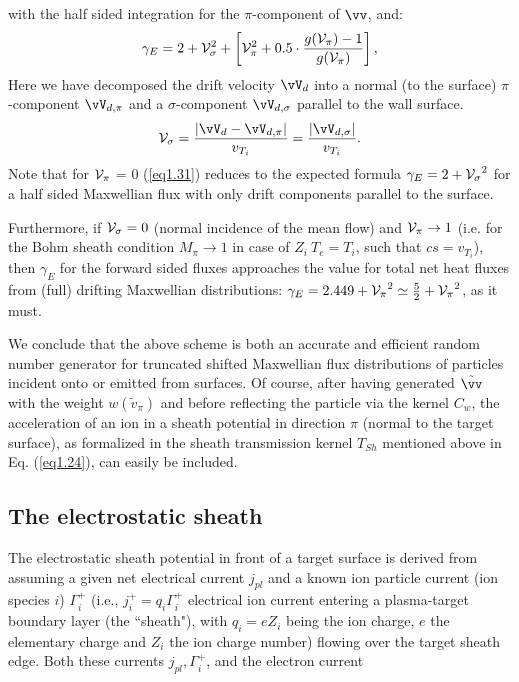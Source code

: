 with the half sided integration for the $\pi$-component of
$\vv$, and:
 \begin{equation}
\gamma_E   =    2 + {\cal V}_\sigma^2    + \left[{\cal V}_\pi^2    +   0.5
\cdot \frac{g({\cal V}_{\pi} )  - 1}{g({\cal V}_{\pi} )}\right]       , \label{eq1.31}
\end{equation}
Here we have decomposed the drift velocity $\vV_d$ into a
normal (to the surface) $\pi$-component $\vV_{d,\pi}$ and a $\sigma$-component $\vV_{d,\sigma}$ parallel to
the wall surface.
\begin{equation}
{\cal V}_{\sigma}   = \frac{ | \vV_d   -   \vV_{d,
\pi} | } {  v_{T_i}} = \frac{ | \vV_{d,\sigma} | } {    v_{T_i}}. \label{eq1.32}
\end{equation}
Note that for ${\cal V}_{\pi}$ = 0 (\ref{eq1.31}) reduces to the expected formula
$\gamma_E   =   2   + {{\cal V}_{\sigma}}^2$  for a half sided Maxwellian flux with only drift components parallel to the surface.

Furthermore, if ${\cal V}_{\sigma}
= 0$ (normal incidence of the mean flow) and ${\cal V}_{\pi} \rightarrow 1$ (i.e. for the Bohm sheath
condition $M_{\pi} \rightarrow 1$ in case of $Z_i~T_e = T_i$, such that $cs = v_{T_i}$), then $\gamma_E$ for the forward sided
fluxes approaches the value for total net heat fluxes from (full) drifting Maxwellian distributions:
$\gamma_E = 2.449 + {{\cal V}_{\pi}}^2 \simeq \frac {5}{2} +
{{\cal V}_{\pi}}^2$, as it must.

We conclude that the above scheme is both an accurate and
efficient random number generator for truncated shifted Maxwellian
flux distributions of particles incident onto or emitted from
surfaces. Of course, after having generated $
\tilde{\vv}  $ with the weight $ w ({\tilde{v} }_{\pi}
)$ and before reflecting the particle via the kernel $C_w $, the
acceleration of an ion in a sheath potential  in direction $\pi$
(normal to the target surface), as formalized in the sheath
transmission kernel $T_{Sh}$ mentioned above in Eq. (\ref{eq1.24}), can easily be
included.

\subsection{The electrostatic sheath} \label{sec1.4.1}


The electrostatic sheath potential in front of a target surface is
derived from assuming a given net electrical current $j_{pl}$ and
a known ion particle current (ion species $i$) $\Gamma^+_i$ (i.e., $j^+_i = q_i
\Gamma^+_i$ electrical ion current entering a plasma-target boundary layer (the ``sheath"), with $q_i=eZ_i$ being the ion charge, $e$ the elementary charge and $Z_i$ the ion charge number)
flowing over the target sheath edge. Both these currents $j_{pl}, \Gamma^+_i$, and the
electron current

